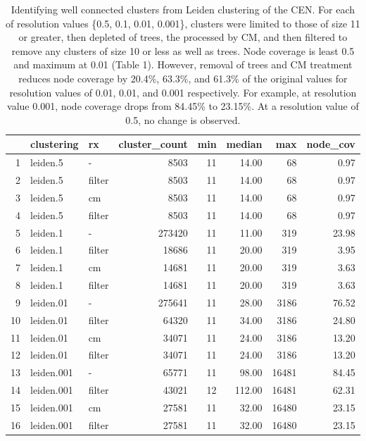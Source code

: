 \documentclass[a4paper]{article}   	%
\begin{document}
\begin{table}[ht]
\centering
\begin{tabular}{rllrrrrr}
  \hline
 & clustering & rx & cluster\_count & min & median & max & node\_cov \\
  \hline
1 & leiden.5 & -  & 8503 &  11 & 14.00 &  68 & 0.97 \\
  2 & leiden.5 & filter & 8503 &  11 & 14.00 &  68 & 0.97 \\
  3 & leiden.5 & cm & 8503 &  11 & 14.00 &  68 & 0.97 \\
  4 & leiden.5 & filter & 8503 &  11 & 14.00 &  68 & 0.97 \\
  5 & leiden.1 & - & 273420 &  11 & 11.00 & 319 & 23.98 \\
  6 & leiden.1 & filter & 18686 &  11 & 20.00 & 319 & 3.95 \\
  7 & leiden.1 & cm & 14681 &  11 & 20.00 & 319 & 3.63 \\
  8 & leiden.1 & filter & 14681 &  11 & 20.00 & 319 & 3.63 \\
  9 & leiden.01 & -& 275641 &  11 & 28.00 & 3186 & 76.52 \\
  10 & leiden.01 & filter & 64320 &  11 & 34.00 & 3186 & 24.80 \\
  11 & leiden.01 & cm & 34071 &  11 & 24.00 & 3186 & 13.20 \\
  12 & leiden.01 & filter & 34071 &  11 & 24.00 & 3186 & 13.20 \\
  13 & leiden.001 & - & 65771 &  11 & 98.00 & 16481 & 84.45 \\
  14 & leiden.001 & filter & 43021 &  12 & 112.00 & 16481 & 62.31 \\
  15 & leiden.001 & cm & 27581 &  11 & 32.00 & 16480 & 23.15 \\
  16 & leiden.001 & filter & 27581 &  11 & 32.00 & 16480 & 23.15 \\
   \hline
\end{tabular}
\caption{Identifying well connected clusters from Leiden clustering of the CEN. For each of resolution values \{0.5, 0.1, 0.01, 0.001\}, clusters were limited to those of size 11 or greater, then depleted of trees, the processed by CM, and then filtered to remove any clusters of size 10 or less as well as trees. Node coverage is least 0.5 and maximum at 0.01 (Table 1). However, removal of trees and CM treatment reduces node coverage by 20.4\%, 63.3\%, and 61.3\% of the original values for resolution values of 0.01, 0.01, and 0.001 respectively.  For example, at resolution value 0.001, node coverage drops from 84.45\% to 23.15\%. At a resolution value of 0.5, no change is observed.}
\label{tab:table2}
\end{table}
\end{document}
